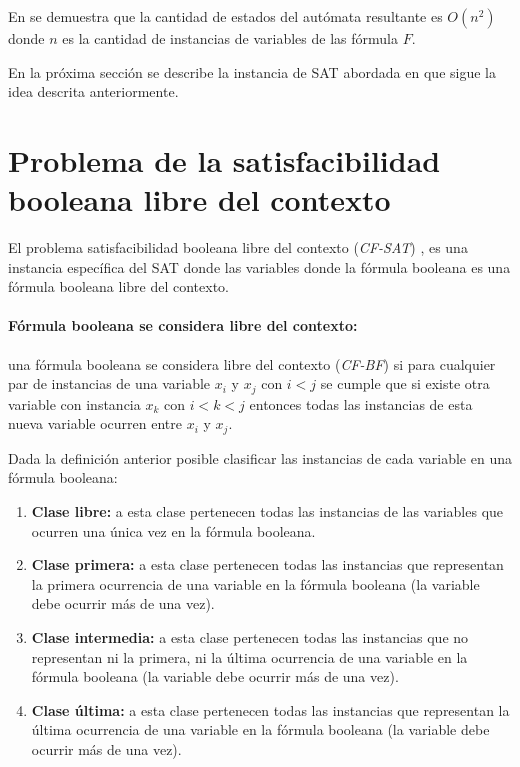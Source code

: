 \documentclass[12pt]{article}
\begin{document}
En \cite{aCFSAT} se demuestra que la cantidad de estados del autómata resultante es $O(n^2)$ donde $n$ es la cantidad de instancias
de variables de las fórmula $F$.

En la próxima sección se describe la instancia de SAT abordada en \cite{aCFSAT} que sigue la idea descrita anteriormente.

\section{Problema de la satisfacibilidad booleana libre del contexto}

El problema satisfacibilidad booleana libre del contexto (\textit{CF-SAT}) \cite{aCFSAT}, es una instancia específica
del SAT donde las variables donde la fórmula booleana es una fórmula booleana libre del contexto.

\paragraph{Fórmula booleana se considera libre del contexto:} una fórmula booleana se considera libre del contexto
(\textit{CF-BF}) si para cualquier par de instancias de una variable $x_i$ y $x_j$ con $i<j$ se
cumple que si existe otra variable con instancia $x_k$ con $i<k<j$ entonces todas las instancias de esta nueva
variable ocurren entre $x_i$ y $x_j$.

Dada la definición anterior posible clasificar las instancias de cada variable en una fórmula booleana:

\begin{enumerate}
      \item \textbf{Clase libre:} a esta clase pertenecen todas las instancias de las variables que ocurren
            una única vez en la fórmula booleana.
      \item \textbf{Clase primera:} a esta clase pertenecen todas las instancias que representan la primera
            ocurrencia de una variable en la fórmula booleana (la variable debe ocurrir más de una vez).
      \item \textbf{Clase intermedia:} a esta clase pertenecen todas las instancias que no representan ni la primera, ni la última
            ocurrencia de una variable en la fórmula booleana (la variable debe ocurrir más de una vez).
      \item \textbf{Clase última:} a esta clase pertenecen todas las instancias que representan la última
            ocurrencia de una variable en la fórmula booleana (la variable debe ocurrir más de una vez).
\end{enumerate}
\end{document}
